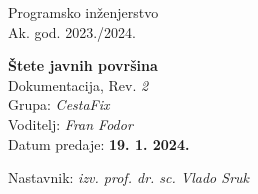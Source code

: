\documentclass[12pt]{report}
\begin{document}
\begin{titlepage}
	\begin{center}
		\LARGE Programsko inženjerstvo\\
		\large Ak. god. 2023./2024.\\


		\huge \textbf{Štete javnih površina}\\
		\Large Dokumentacija, Rev. \textit{2}\\

		\normalsize
		Grupa: \textit{CestaFix}\\
		Voditelj: \textit{Fran Fodor}\\


		Datum predaje: \textbf{{19. 1. 2024.}}\\


		Nastavnik: \textit{izv. prof. dr. sc. Vlado Sruk}\\

	\end{center}


\end{titlepage}


\tableofcontents











\begingroup
\renewcommand*\listfigurename{Indeks slika i dijagrama}
\listoffigures
\endgroup
{}



\eject


\end{document}
